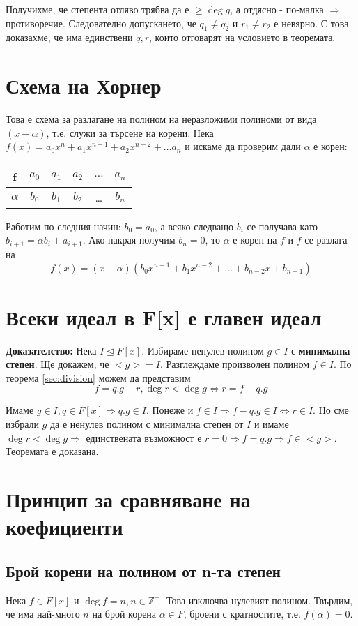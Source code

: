 \documentclass[fleqn,12pt]{article}
\begin{document}
Получихме, че степента отляво трябва да е $\geq \deg g$, а отдясно - по-малка
$\Rightarrow$ противоречие. Следователно допускането, че $q_1 \neq q_2$ и $r_1 \neq r_2$ е невярно.
С това доказахме, че има единствени $q,r$, които отговарят на условието в теоремата.


\section{Схема на Хорнер}
Това е схема за разлагане на полином на неразложими полиноми от вида $(x - \alpha)$, т.е. служи за търсене на корени.
Нека $f(x) = a_0 x^n + a_1 x^{n-1} + a_2 x^{n-2} + \dots a_n$ и искаме да проверим дали $\alpha$ е корен:

\begin{tabular}{ |c|c|c|c|c|c| } 
    \hline
    f        & $a_0$ & $a_1$ & $a_2$ & $\dots$ & $a_n$ \\ 
    \hline
    $\alpha$ & $b_0$ & $b_1$ & $b_2$ & \dots & $b_n$  \\ 
    \hline
\end{tabular}

Работим по следния начин: $b_0 = a_0$, а всяко следващо $b_i$ се получава като $b_{i+1} = \alpha b_i + a_{i+1}$.
Ако накрая получим $b_n = 0$, то $\alpha$ е корен на $f$ и $f$ се разлага на 
\[ f(x) = (x - \alpha)(b_0 x^{n-1} + b_1 x^{n-2} + \dots + b_{n-2} x + b_{n-1}) \]

\section{Всеки идеал в F[x] е главен идеал}
\textbf{Доказателство: } Нека $I \trianglelefteq F[x]$. Избираме ненулев полином $g \in I$ с \textbf{минимална степен}.
Ще докажем, че $<g> = I$.
Разглеждаме произволен полином $f \in I$. По теорема \ref{sec:division} можем да представим 
\[ f = q.g + r, \deg r < \deg g \Leftrightarrow r = f - q.g \]

Имаме $g \in I, q \in F[x] \Rightarrow q.g \in I$. Понеже и $f \in I \Rightarrow f - q.g \in I \Leftrightarrow r \in I$.
Но сме избрали $g$ да е ненулев полином с минимална степен от $I$ и имаме $\deg r < \deg g \Rightarrow$ единствената възможност
е $r = 0 \Rightarrow f = q.g \Rightarrow f \in <g>$. Теоремата е доказана.

\section{Принцип за сравняване на коефициенти}
\subsection{Брой корени на полином от n-та степен}
Нека $f \in F[x]$ и $\deg f = n, n \in \mathbb{Z}^+$. Това изключва нулевият полином.
Твърдим, че има най-много $n$ на брой корена $\alpha \in F$, броени с кратностите, т.е. $f(\alpha) = 0$.
\end{document}
